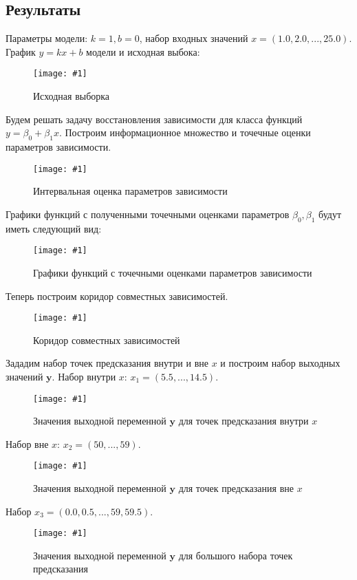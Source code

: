 \documentclass[a4paper,12pt]{article}
\newcommand{\plot}[3]{
    \begin{figure}[H]
        \texttt{[image: \#1]}
        \caption{#2}
        \label{#3}
    \end{figure}
}
\begin{document}
    \subsection{Результаты}
    Параметры модели: $ k = 1, b = 0 $, набор входных значений $ x = (1.0, 2.0, ..., 25.0) $.
    График $ y = kx + b $ модели и исходная выбока:
    \plot{Model}{Исходная выборка}{p:model}

    \noindent
    Будем решать задачу восстановления зависимости для класса функций $ y = \beta_{0} + \beta_{1}x $.
    Построим информационное множество и точечные оценки параметров зависимости.
    \plot{InformationSet}{Интервальная оценка параметров зависимости}{p:informset}

    \noindent
    Графики функций с полученными точечными оценками параметров $ \beta_{0}, \beta_{1} $ будут иметь следующий вид:
    \plot{BuildedModels}{Графики функций с точечными оценками параметров зависимости}{p:buildedmodels}

    \noindent
    Теперь построим коридор совместных зависимостей.
    \plot{CorridorOfSharedDependencies}{Коридор совместных зависимостей}{p:corridor}

    \noindent
    Зададим набор точек предсказания внутри и вне $ x $ и построим набор выходных значений $ \textbf{y} $. \newline
    Набор внутри $ x $: $ x_{1} = (5.5, ..., 14.5) $.
    \plot{Predict5.5-14.5}{Значения выходной переменной $ \textbf{y} $ для точек предсказания внутри $ x $}{p:predictinner}

    \noindent
    Набор вне $ x $: $ x_{2} = (50, ..., 59) $.
    \plot{Predict50-59}{Значения выходной переменной $ \textbf{y} $ для точек предсказания вне $ x $}{p:predictouter}

    \noindent
    Набор $ x_{3} = (0.0, 0.5, ..., 59, 59.5) $.
    \plot{Predict0.0-59.5}{Значения выходной переменной $ \textbf{y} $ для большого набора точек предсказания}{p:predictgeneral}
\end{document}
